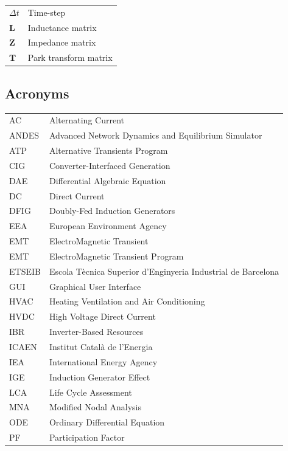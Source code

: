 \newpage
\begin{tabular}{l@{\hspace{1.95cm}} l}
  $\Delta t$ & Time-step \\
  $\bm{L} $ & Inductance matrix\\
  $\bm{Z} $ & Impedance matrix\\
  $\bm{T} $ & Park transform matrix\\

\end{tabular}


\subsection*{Acronyms}
\begin{tabular}{l@{\hspace{1cm}} l}
  AC & Alternating Current \\
  ANDES & Advanced Network Dynamics and Equilibrium Simulator\\
  ATP & Alternative Transients Program \\
  CIG & Converter-Interfaced Generation \\
  DAE & Differential Algebraic Equation\\
  DC & Direct Current \\
  DFIG & Doubly-Fed Induction Generators\\
  EEA & European Environment Agency\\
  EMT & ElectroMagnetic Transient\\
  EMT& ElectroMagnetic Transient Program \\
  ETSEIB & Escola Tècnica Superior d'Enginyeria Industrial de Barcelona\\
  GUI & Graphical User Interface\\
  HVAC & Heating Ventilation and Air Conditioning \\
  HVDC & High Voltage Direct Current \\
  IBR & Inverter-Based Resources \\
  ICAEN & Institut Català de l'Energia \\
  IEA & International Energy Agency \\
  IGE & Induction Generator Effect\\
  LCA & Life Cycle Assessment \\
  MNA & Modified Nodal Analysis\\
  ODE & Ordinary Differential Equation \\
  PF & Participation Factor\\

\end{tabular}
